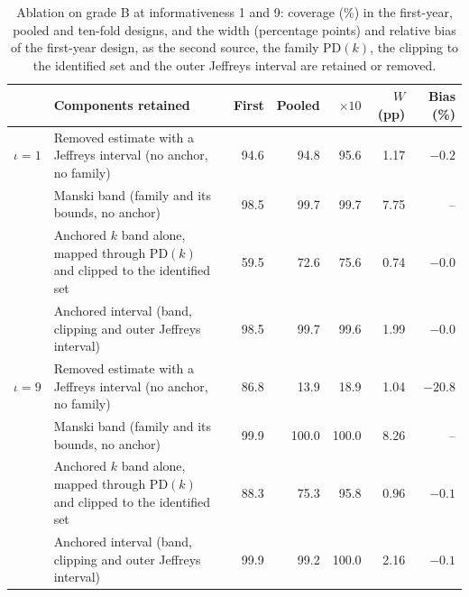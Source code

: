 \begin{table}[htbp]
\centering
\small
\caption{Ablation on grade B at informativeness 1 and 9: coverage (\%) in the first-year, pooled and ten-fold designs, and the width (percentage points) and relative bias of the first-year design, as the second source, the family PD$(k)$, the clipping to the identified set and the outer Jeffreys interval are retained or removed.}
\label{tab:ablation}
\begin{tabular}{p{0.9cm}p{6.1cm}rrrrr}
\toprule
 & Components retained & First & Pooled & $\times10$ & $W$ (pp) & Bias (\%) \\
\midrule
$\iota=1$ & Removed estimate with a Jeffreys interval (no anchor, no family) & 94.6 & 94.8 & 95.6 & 1.17 & $-0.2$ \\
 & Manski band (family and its bounds, no anchor) & 98.5 & 99.7 & 99.7 & 7.75 & -- \\
 & \relax Anchored $k$ band alone, mapped through PD$(k)$ and clipped to the identified set & 59.5 & 72.6 & 75.6 & 0.74 & $-0.0$ \\
 & Anchored interval (band, clipping and outer Jeffreys interval) & 98.5 & 99.7 & 99.6 & 1.99 & $-0.0$ \\
$\iota=9$ & Removed estimate with a Jeffreys interval (no anchor, no family) & 86.8 & 13.9 & 18.9 & 1.04 & $-20.8$ \\
 & Manski band (family and its bounds, no anchor) & 99.9 & 100.0 & 100.0 & 8.26 & -- \\
 & \relax Anchored $k$ band alone, mapped through PD$(k)$ and clipped to the identified set & 88.3 & 75.3 & 95.8 & 0.96 & $-0.1$ \\
 & Anchored interval (band, clipping and outer Jeffreys interval) & 99.9 & 99.2 & 100.0 & 2.16 & $-0.1$ \\
\bottomrule
\end{tabular}
\end{table}
